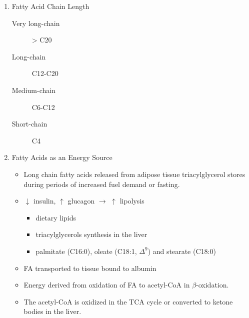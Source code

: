 \documentclass{scrartcl}
\begin{document}
\begin{enumerate}
\item Fatty Acid Chain Length
\label{sec:org886ae4b}

\begin{description}
\item[{Very long-chain}] > C20
\item[{Long-chain}] C12-C20
\item[{Medium-chain}] C6-C12
\item[{Short-chain}] C4
\end{description}

\item Fatty Acids as an Energy Source
\label{sec:orgd308aa5}

\begin{itemize}
\item Long chain fatty acids released from adipose tissue triacylglycerol
stores during periods of increased fuel demand or fasting.
\item \(\downarrow\) insulin, \(\uparrow\) glucagon \(\to\) \(\uparrow\) lipolysis
\begin{itemize}
\item dietary lipids
\item triacylglycerols synthesis in the liver
\item palmitate (C16:0), oleate (C18:1, \(\Delta^{\text{9}}\)) and stearate (C18:0)
\end{itemize}
\item FA transported to tissue bound to albumin
\item Energy derived from oxidation of FA to acetyl-CoA in \(\beta\)-oxidation.
\item The acetyl-CoA is oxidized in the TCA cycle or converted to ketone bodies in the liver.
\end{itemize}
\end{enumerate}
\end{document}
